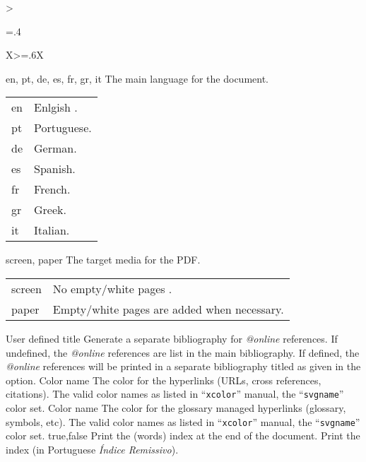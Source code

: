 \begin{xltabular}{\linewidth}{>{\hsize=.4\hsize\raggedright\arraybackslash}X>{\hsize=.6\hsize}X}
  \midrule
  {en, pt, de, es, fr, gr, it}%
  {The main language for the document.}%
  {%
    \begin{tabular}{@{}l@{ $\rightarrow$ }X@{}}
      en & Enlgish . \\
      pt & Portuguese.         \\
      de & German.             \\
      es & Spanish.            \\
      fr & French.             \\
      gr & Greek.              \\
      it & Italian.            \\
    \end{tabular}
  }
  \midrule
  {screen, paper}%
  {The target media for the PDF.}%
  {%
    \begin{tabular}{@{}l@{ $\rightarrow$ }X@{}}
      screen & No empty/white pages .            \\
      paper  & Empty/white pages are added when necessary. \\
    \end{tabular}
  }
  \midrule
  {User defined title}%
  {Generate a separate bibliography for \emph{@online} references.}%
  {%
    If undefined, the \emph{@online} references are list in the main bibliography.  If defined, the \emph{@online} references will be printed in a separate bibliography titled as given in the option.
  }
  \midrule
  {Color name}%
  {The color for the hyperlinks (URLs, cross references, citations).}%
  {%
    The valid color names as listed in “\texttt{xcolor}” manual, the “\texttt{svgname}” color set.
  }
  \midrule
  {Color name}%
  {The color for the glossary managed hyperlinks (glossary, symbols, etc).}%
  {%
    The valid color names as listed in “\texttt{xcolor}” manual, the “\texttt{svgname}” color set.
  }
  \midrule
  {true,\newline false }%
  {Print the (words) index at the end of the document.}%
  {%
    Print the index (in Portuguese \emph{Índice Remissivo}).
  }
  \bottomrule
\end{xltabular}
\egroup


